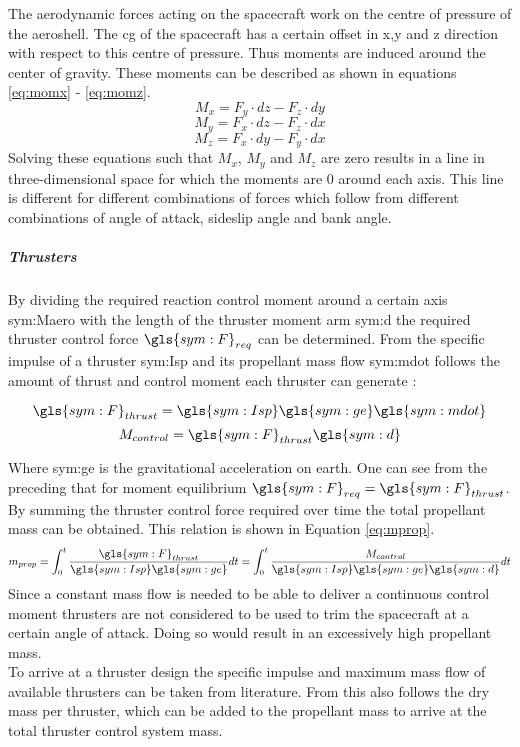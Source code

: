 The aerodynamic forces acting on the spacecraft work on the centre of pressure of the aeroshell. The \gls{cg} of the spacecraft has a certain offset in x,y and z direction with respect to this centre of pressure. Thus moments are induced around the center of gravity. These moments can be described as shown in equations \ref{eq:momx} - \ref{eq:momz}.
\begin{equation}
\label{eq:momx}
M_x = F_y \cdot dz - F_z \cdot dy
\end{equation}
\begin{equation}
\label{eq:momy}
M_y = F_x \cdot dz - F_z \cdot dx
\end{equation}
\begin{equation}
\label{eq:momz}
M_z = F_x \cdot dy - F_y \cdot dx
\end{equation}
Solving these equations such that $M_{x}$, $M_{y}$ and $M_{z}$ are zero results in a line in three-dimensional space for which the moments are 0 around each axis. This line is different for different combinations of forces which follow from different combinations of angle of attack, sideslip angle and bank angle.

\subparagraph{Thrusters}
\label{subpar:thrusters}

By dividing the required reaction control moment around a certain axis \gls{sym:Maero} with the length of the thruster moment arm \gls{sym:d} the required thruster control force $\gls{sym:F}_{req}$ can be determined. From the specific impulse of a thruster \gls{sym:Isp} and its propellant mass flow \gls{sym:mdot} follows the amount of thrust and control moment each thruster can generate \cite{Allen2012}:
\begin{multicols}{2}
\begin{equation}
\gls{sym:F}_{thrust}=\gls{sym:Isp}\gls{sym:ge}\gls{sym:mdot}
\label{eq:Fthrust}
\end{equation}
\begin{equation}
M_{control}=\gls{sym:F}_{thrust}\gls{sym:d}
\end{equation}
\end{multicols}
Where \gls{sym:ge} is the gravitational acceleration on earth. One can see from the preceding that for moment equilibrium $\gls{sym:F}_{req}=\gls{sym:F}_{thrust}$. By summing the thruster control force required over time the total propellant mass can be obtained. This relation is shown in Equation \ref{eq:mprop}.
\begin{equation}
m_{prop}=\int_{0}^{t} \frac{\gls{sym:F}_{thrust}}{\gls{sym:Isp}\gls{sym:ge}} dt = \int_{0}^{t} \frac{M_{control}}{\gls{sym:Isp}\gls{sym:ge}\gls{sym:d}} dt
\label{eq:mprop}
\end{equation}
Since a constant mass flow is needed to be able to deliver a continuous control moment thrusters are not considered to be used to trim the spacecraft at a certain angle of attack. Doing so would result in an excessively high propellant mass. \\
To arrive at a thruster design the specific impulse and maximum mass flow of available thrusters can be taken from literature. From this also follows the dry mass per thruster, which can be added to the propellant mass to arrive at the total thruster control system mass.

